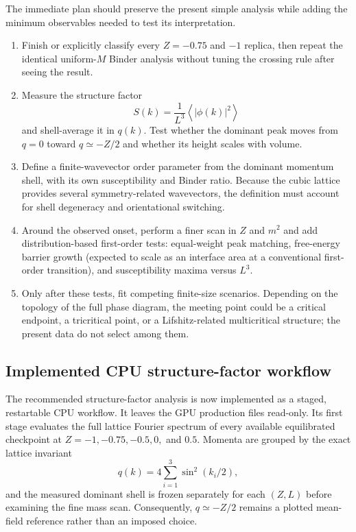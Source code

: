\documentclass[11pt]{article}
\begin{document}
The immediate plan should preserve the present simple analysis while adding
the minimum observables needed to test its interpretation.

\begin{enumerate}
  \item Finish or explicitly classify every $Z=-0.75$ and $-1$ replica, then
  repeat the identical uniform-$M$ Binder analysis without tuning the crossing
  rule after seeing the result.

  \item Measure the structure factor
  \begin{equation}
    S(k)=\frac{1}{L^3}\left\langle |\phi(k)|^2\right\rangle
  \end{equation}
  and shell-average it in $q(k)$.  Test whether the dominant peak moves from
  $q=0$ toward $q\simeq -Z/2$ and whether its height scales with volume.

  \item Define a finite-wavevector order parameter from the dominant momentum
  shell, with its own susceptibility and Binder ratio.  Because the cubic
  lattice provides several symmetry-related wavevectors, the definition must
  account for shell degeneracy and orientational switching.

  \item Around the observed onset, perform a finer scan in $Z$ and $m^2$ and
  add distribution-based first-order tests: equal-weight peak matching,
  free-energy barrier growth (expected to scale as an interface area at a
  conventional first-order transition), and susceptibility maxima versus
  $L^3$.

  \item Only after these tests, fit competing finite-size scenarios.  Depending
  on the topology of the full phase diagram, the meeting point could be a
  critical endpoint, a tricritical point, or a Lifshitz-related multicritical
  structure; the present data do not select among them.
\end{enumerate}

\subsection{Implemented CPU structure-factor workflow}

The recommended structure-factor analysis is now implemented as a staged,
restartable CPU workflow.  It leaves the GPU production files read-only.  Its
first stage evaluates the full lattice Fourier spectrum of every available
equilibrated checkpoint at $Z=-1,-0.75,-0.5,0,$ and $0.5$.  Momenta are grouped
by the exact lattice invariant
\begin{equation}
  q(k)=4\sum_{i=1}^{3}\sin^2(k_i/2),
\end{equation}
and the measured dominant shell is frozen separately for each $(Z,L)$ before
examining the fine mass scan.  Consequently, $q\simeq -Z/2$ remains a plotted
mean-field reference rather than an imposed choice.
\end{document}
